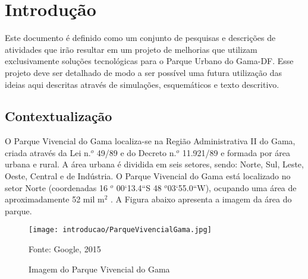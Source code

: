 \chapter*[Introdução]{Introdução}

Este documento é definido como um conjunto de pesquisas e descri\c{c}\~oes de atividades que ir\~ao resultar em um projeto de melhorias que utilizam exclusivamente solu\c{c}\~oes tecnol\'ogicas para o Parque Urbano do Gama-DF. Esse projeto deve ser detalhado de modo a ser poss\'ivel uma futura utiliza\c{c}\~ao das ideias aqui descritas atrav\'es de simula\c{c}\~oes, esquem\'aticos e texto descritivo. 

\section{Contextualiza\c{c}\~ao}

O Parque Vivencial do Gama localiza-se na Regi\~ao Administrativa II do Gama, criada atrav\'es da Lei n.$^o$ 49/89 e do Decreto n.$^o$ 11.921/89 e formada por \'area urbana e rural. A \'area urbana \'e dividida em seis setores, sendo: Norte, Sul, Leste, Oeste, Central e de Ind\'ustria. O Parque Vivencial do Gama est\'a localizado no setor Norte (coordenadas 16 $^o$ 00`13.4``S 48 $^o$03`55.0``W), ocupando uma \'area de aproximadamente 52 mil m$^{2}$ \cite{COEX}. A Figura abaixo apresenta a imagem da \'area do parque.

\begin{figure}[H]
	\centering
	\label{Imagem do Parque Vivencial do Gama}
		\texttt{[image: introducao/ParqueVivencialGama.jpg]}
	\caption{Imagem do Parque Vivencial do Gama}
	\small{Fonte: Google, 2015}
\end{figure}
